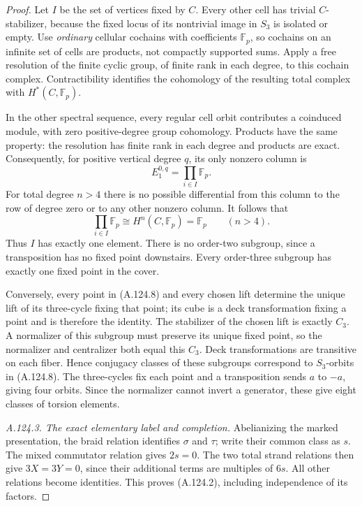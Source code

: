 \begin{proof}
Let \(I\) be the set of vertices fixed by \(C\). Every other cell
has trivial \(C\)-stabilizer, because the fixed locus of its
nontrivial image in \(S_3\) is isolated or empty.
Use \emph{ordinary} cellular cochains with coefficients
\(\mathbb F_p\), so cochains on an infinite set of cells are products,
not compactly supported sums. Apply a free resolution of the finite
cyclic group, of finite rank in each degree, to this cochain complex.
Contractibility identifies the cohomology of the resulting total
complex with \(H^*(C,\mathbb F_p)\).

In the other spectral sequence, every regular cell orbit contributes
a coinduced module, with zero positive-degree group cohomology.
Products have the same property: the resolution has finite rank in
each degree and products are exact. Consequently, for positive
vertical degree \(q\), its only nonzero column is
\[
       E_1^{0,q}=\prod_{i\in I}\mathbb F_p.
 \tag{A.124.9}
\]
For total degree \(n>4\) there is no possible differential from this
column to the row of degree zero or to any other nonzero column.
It follows that
\[
       \prod_{i\in I}\mathbb F_p
          \cong H^n(C,\mathbb F_p)=\mathbb F_p
                    \qquad(n>4).
 \tag{A.124.10}
\]
Thus \(I\) has exactly one element. There is no order-two subgroup,
since a transposition has no fixed point downstairs. Every
order-three subgroup has exactly one fixed point in the cover.

Conversely, every point in (A.124.8) and every chosen lift determine
the unique lift of its three-cycle fixing that point; its cube is
a deck transformation fixing a point and is therefore the identity.
The stabilizer of the chosen lift is exactly \(C_3\). A normalizer
of this subgroup must preserve its unique fixed point, so the
normalizer and centralizer both equal this \(C_3\).
Deck transformations are transitive on each fiber. Hence conjugacy
classes of these subgroups correspond to \(S_3\)-orbits in (A.124.8).
The three-cycles fix each point and a transposition sends \(a\) to
\(-a\), giving four orbits. Since the normalizer cannot invert a
generator, these give eight classes of torsion elements.

\emph{A.124.3. The exact elementary label and completion.}
Abelianizing the marked presentation, the braid relation identifies
\(\sigma\) and \(\tau\); write their common class as \(s\).
The mixed commutator relation gives \(2s=0\).
The two total strand relations then give \(3X=3Y=0\), since their
additional terms are multiples of \(6s\). All other relations become
identities. This proves (A.124.2), including independence of its factors.


\end{proof}
